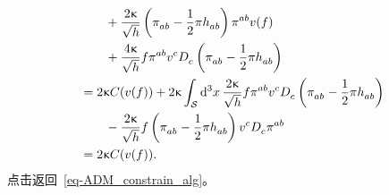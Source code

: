 \begin{Proof}
\begin{align*}
				&\qquad {}+ \frac{2\gkappa}{\sqrt{h}} \left( \tensor{\pi}{_a_b} - \frac{1}{2} \pi \tensor{h}{_a_b} \right) \tensor{\pi}{^a^b} v(f)\\
				& \qquad {} + \frac{4\gkappa}{\sqrt{h}} f \tensor{\pi}{^a^b} \tensor{v}{^c} \tensor{D}{_c} \left( \tensor{\pi}{_a_b} - \frac{1}{2} \pi \tensor{h}{_a_b} \right)\\
				&= 2\gkappa C(v(f)) + 2\gkappa \int_{\spc} \dd[3]{x} \frac{2\gkappa}{\sqrt{h}} f \tensor{\pi}{^a^b} \tensor{v}{^c} \tensor{D}{_c} \left( \tensor{\pi}{_a_b} - \frac{1}{2} \pi \tensor{h}{_a_b} \right)\\
				& \qquad {} - \frac{2\gkappa}{\sqrt{h}} f \left( \tensor{\pi}{_a_b} - \frac{1}{2} \pi \tensor{h}{_a_b} \right) \tensor{v}{^c} \tensor{D}{_c} \tensor{\pi}{^a^b}\\
				&= 2\gkappa C(v(f)).
			\end{align*}
			{\normalfont\ttfamily\color{green} 点击返回~\eqref{eq-ADM_constrain_alg}。}
		\end{Proof}

